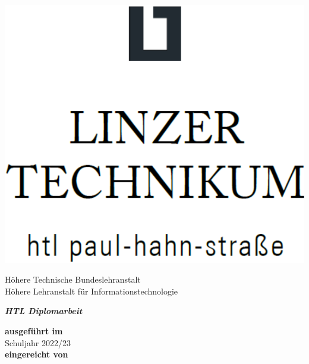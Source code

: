 

\begin{titlepage}
\begin{center}

\vspace*{-15mm}
\includegraphics[scale=0.15]{assets/litec-logo-high-res.png}

\vspace*{0.35cm}

{
\Large
\begin{spacing}{1.5}
Höhere Technische Bundeslehranstalt\\
Höhere Lehranstalt für Informationstechnologie%
\end{spacing}
}

\vspace{1.75cm}

{
\Huge
\color{litec-blue}
\textbf{\textit{HTL Diplomarbeit}}
}

\vspace{1.2cm}

{
\Huge
\textit{\ThesisTitle}
}

\vspace{0.9cm}

\begin{spacing}{3}
\textbf{ausgeführt im}\\
{
\Huge
\color{litec-blue}
{Schuljahr 2022/23}
}\\
\vspace{0.5cm}
\textbf{eingereicht von}
\end{spacing}


\end{center}
\end{titlepage}
